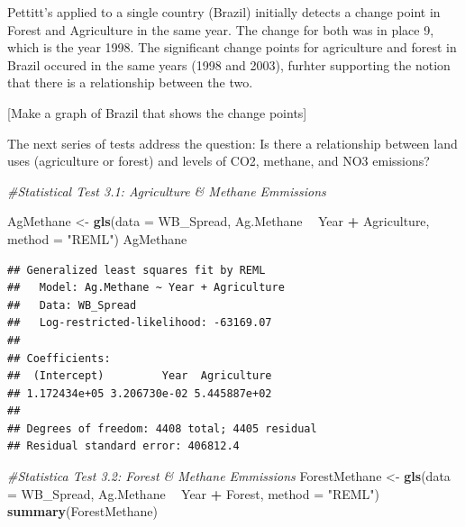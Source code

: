 \documentclass[12pt,]{article}
\newenvironment{Shaded}{\begin{snugshade}}{\end{snugshade}}
\newcommand{\KeywordTok}[1]{\textcolor[rgb]{0.13,0.29,0.53}{\textbf{#1}}}
\newcommand{\DataTypeTok}[1]{\textcolor[rgb]{0.13,0.29,0.53}{#1}}
\newcommand{\StringTok}[1]{\textcolor[rgb]{0.31,0.60,0.02}{#1}}
\newcommand{\CommentTok}[1]{\textcolor[rgb]{0.56,0.35,0.01}{\textit{#1}}}
\newcommand{\OperatorTok}[1]{\textcolor[rgb]{0.81,0.36,0.00}{\textbf{#1}}}
\newcommand{\NormalTok}[1]{#1}
\begin{document}
Pettitt's applied to a single country (Brazil) initially detects a
change point in Forest and Agriculture in the same year. The change for
both was in place 9, which is the year 1998. The significant change
points for agriculture and forest in Brazil occured in the same years
(1998 and 2003), furhter supporting the notion that there is a
relationship between the two.

{[}Make a graph of Brazil that shows the change points{]}

The next series of tests address the question: Is there a relationship
between land uses (agriculture or forest) and levels of CO2, methane,
and NO3 emissions?

\begin{Shaded}
\begin{Highlighting}[]
\CommentTok{#Statistical Test 3.1: Agriculture & Methane Emmissions}

\NormalTok{AgMethane <-}\StringTok{ }\KeywordTok{gls}\NormalTok{(}\DataTypeTok{data =}\NormalTok{ WB_Spread,}
\NormalTok{                 Ag.Methane }\OperatorTok{~}\StringTok{ }\NormalTok{Year }\OperatorTok{+}\StringTok{ }\NormalTok{Agriculture,}
                 \DataTypeTok{method =} \StringTok{"REML"}\NormalTok{)}
\NormalTok{AgMethane}
\end{Highlighting}
\end{Shaded}

\begin{verbatim}
## Generalized least squares fit by REML
##   Model: Ag.Methane ~ Year + Agriculture 
##   Data: WB_Spread 
##   Log-restricted-likelihood: -63169.07
## 
## Coefficients:
##  (Intercept)         Year  Agriculture 
## 1.172434e+05 3.206730e-02 5.445887e+02 
## 
## Degrees of freedom: 4408 total; 4405 residual
## Residual standard error: 406812.4
\end{verbatim}

\begin{Shaded}
\begin{Highlighting}[]
\CommentTok{#Statistica Test 3.2: Forest & Methane Emmissions}
\NormalTok{ForestMethane <-}\StringTok{ }\KeywordTok{gls}\NormalTok{(}\DataTypeTok{data =}\NormalTok{ WB_Spread, }
\NormalTok{                  Ag.Methane }\OperatorTok{~}\StringTok{ }\NormalTok{Year }\OperatorTok{+}\StringTok{ }\NormalTok{Forest,}
                  \DataTypeTok{method =} \StringTok{"REML"}\NormalTok{)}
\KeywordTok{summary}\NormalTok{(ForestMethane)}
\end{Highlighting}
\end{Shaded}
\end{document}
